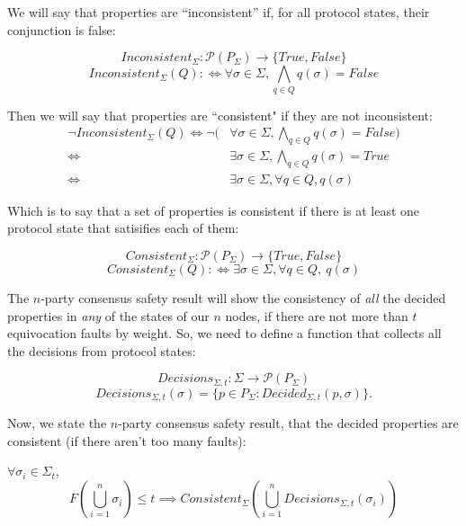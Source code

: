 We will say that properties are ``inconsistent'' if, for all protocol states, their conjunction is false:

\begin{defn}
$$ Inconsistent_\Sigma : \mathcal{P}(P_\Sigma) \to \{True, False\}$$
$$ Inconsistent_\Sigma(Q): \Leftrightarrow \forall \sigma \in \Sigma, \bigwedge_{q \in Q} q(\sigma) = False $$
\end{defn}

Then we will say that properties are ``consistent" if they are not inconsistent:
\begin{align}
\neg Inconsistent_\Sigma(Q) \iff \neg (&\forall \sigma \in \Sigma, \bigwedge_{q \in Q} q(\sigma) = False) \\
\iff &\exists \sigma \in \Sigma, \bigwedge_{q \in Q} q(\sigma) = True \\
\iff &\exists \sigma \in \Sigma, \forall q \in Q, q(\sigma)
\end{align}

Which is to say that a set of properties is consistent if there is at least one protocol state that satisifies each of them:

\begin{defn}
$$ Consistent_\Sigma : \mathcal{P}(P_\Sigma) \to \{True, False\}$$
$$ Consistent_\Sigma(Q): \Leftrightarrow \exists \sigma \in \Sigma, \forall q \in Q, ~ q(\sigma)$$
\end{defn}

The $n$-party consensus safety result will show the consistency of \emph{all} the decided properties in \emph{any} of the states of our $n$ nodes, if there are not more than $t$ equivocation faults by weight. So, we need to define a function that collects all the decisions from protocol states:

\begin{defn}
$$ Decisions_{\Sigma,t} : \Sigma \to \mathcal{P}(P_\Sigma)$$
$$ Decisions_{\Sigma,t}(\sigma)= \{ p \in P_\Sigma: Decided_{\Sigma, t}(p,\sigma) \}.$$
\end{defn}

Now, we state the $n$-party consensus safety result, that the decided properties are consistent (if there aren't too many faults):

\begin{thm}
\label{thm:nparty_consensus_safety}
$\forall \sigma_i \in \Sigma_t$,
$$
F(\bigcup_{i=1}^n \sigma_i) \leq t \implies Consistent_\Sigma(\bigcup_{i=1}^n Decisions_{\Sigma,t}(\sigma_i))
$$
\end{thm}

